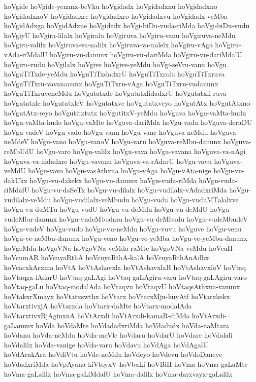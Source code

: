 {hoVgide
hoVgide-yenanx-beVku
hoVgidadx
hoVgidadxnu
hoVgidadxno
hoVgidadxnoV
hoVgidadxre
hoVgidadxro
hoVgidadxvu
hoVgidadx-veMba
hoVgidAdxga
hoVgidAdxne
hoVgidedx
hoVgi-biDu-vuda-riMda
hoVgi-biDu-vudu
hoVgiyU
hoVgira-lilalx
hoVgiralu
hoVgiruva
hoVgiru-vanu
hoVgiruva-neMdu
hoVgiru-valilx
hoVgiruva-va-nalilx
hoVgiruva-va-nalelx
hoVgiru-vAga
hoVgiru-vAda-riMdalU
hoVgiru-vu-danunx
hoVgiru-vu-dariMda
hoVgiru-vu-dariMdalU
hoVgiru-vudu
hoVgilalx
hoVgive
hoVgive-yeMdu
hoVgi-seVru-vanu
hoVgu
hoVguTiTxde-yeMdu
hoVguTiTxdadxrU
hoVguTiTxralu
hoVguTiTxruva
hoVguTiTxru-vavananunx
hoVguTiTxru-vAga
hoVguTiTxru-vudanunx
hoVguTiTxruveneMdu
hoVgutatxde
hoVgutatxlidadxrU
hoVgutatxli-ruva
hoVgutatxle
hoVgutatxleV
hoVgutatxve
hoVgutatxveyo
hoVgutAtx
hoVgutAtxno
hoVgutAtx-reyo
hoVgutitxtutx
hoVgutitxV-yeMdu
hoVguva
hoVgu-vaMta-hudu
hoVgu-vaMta-hudo
hoVgu-vaMte
hoVguva-dariMda
hoVgu-vadu
hoVguva-deraDU
hoVgu-vadeV
hoVgu-vado
hoVgu-vanu
hoVgu-vane
hoVguva-neMdu
hoVguva-neMdeV
hoVgu-vano
hoVgu-vanoV
hoVgu-varu
hoVguva-reMbu-danunx
hoVguva-reMbUdU
hoVgu-varo
hoVgu-valilx
hoVgu-vava
hoVgu-vavana
hoVguva-va-nAgi
hoVguva-va-nidadxre
hoVgu-vavanu
hoVguva-va-rAdarU
hoVgu-vavu
hoVguva-veMdU
hoVgu-vavo
hoVgu-vasAthxna
hoVgu-vAga
hoVgu-vAta-nige
hoVgu-vu-dakUkx
hoVgu-vu-dakekx
hoVgu-vu-danunx
hoVgu-vuda-riMda
hoVgu-vuda-riMdalU
hoVgu-vu-daSeTx
hoVgu-vu-dilalx
hoVgu-vudilalx-vAdadxriMda
hoVgu-vudilalx-veMdu
hoVgu-vudilalx-veMbudu
hoVgu-vudu
hoVgu-vuduMTalalxve
hoVgu-vu-duMTu
hoVgu-vudU
hoVgu-vu-deMdu
hoVgu-vu-deMdU
hoVgu-vudeMbu-danunx
hoVgu-vudeMbudara
hoVgu-vu-deMbudu
hoVgu-vudeMbudeV
hoVgu-vudeV
hoVgu-vudo
hoVgu-vu-neMdu
hoVgu-vuvu
hoVguve
hoVgu-venu
hoVgu-ve-neMbu-danunx
hoVgu-veno
hoVgu-ve-yeMba
hoVgu-ve-yeMbu-danunx
hoVgeMdu
hoVgoVNa
hoVgoVNa-veMda-raMte
hoVgoVNa-veMdu
hoVcuH
hoVcumAR
hoVcuyaRthA
hoVcuyaRthA-kalA
hoVcuyaRthAnAdhx
hoVcacxkArxma
hoVtA
hoVtAshavxla
hoVtAshavxlaH
hoVtAshavxloV
hoVtaq
hoVtaqga-lAdarU
hoVtaq-gaLAgi
hoVtaq-gaLAgiru-varu
hoVtaq-gaLAgiru-varo
hoVtaq-gaLu
hoVtaq-modalAda
hoVtaqvu
hoVtaqvU
hoVtaqsAthxna-vanunx
hoVtakxrXmayx
hoVtatxswthx
hoVtarx
hoVtarxMju-huyAtf
hoVtarxkekx
hoVtarxtivxjA
hoVtarxda
hoVtarx-daMte
hoVtarx-modalAda
hoVtarxtivxRjAginxnA
hoVtArxdi
hoVtArxdi-kamaR-diMda
hoVtArxdi-gaLanunx
hoVda
hoVdaMte
hoVdadadxriMda
hoVdadudx
hoVda-naMtara
hoVdanu
hoVda-neMdu
hoVda-meVle
hoVdaru
hoVdarU
hoVdare
hoVdalali
hoVdalilx
hoVda-vanige
hoVda-varu
hoVdavu
hoVdAga
hoVdAgalU
hoVdAcakAra
hoVdiVtu
hoVde-neMdu
hoVdeyo
hoVdevu
hoVdoDaneye
hoVdadxriMda
hoVpAyana-kiVtoyxV
hoVbaLi
hoVBiH
hoVma
hoVma-gaLaMte
hoVma-gaLalilx
hoVma-gaLiMdalU
hoVma-dalilx
hoVma-darxvayx-gaLalilx
}
